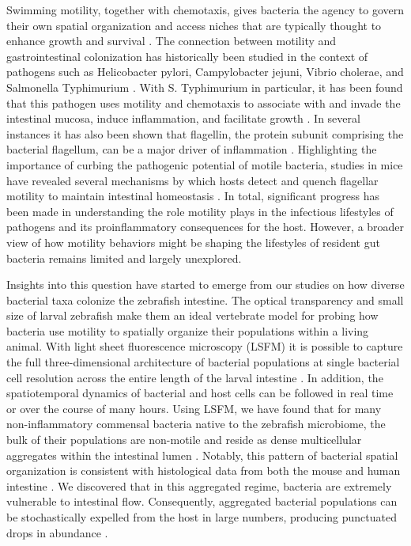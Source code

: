Swimming motility, together with chemotaxis, gives bacteria the agency to govern their own spatial organization and access niches that are typically thought to enhance growth and survival \cite{wei_population_2011,yawata_competition-dispersal_2014,raina_role_2019,stecher_motility_2008}. The connection between motility and gastrointestinal colonization has historically been studied in the context of pathogens such as Helicobacter pylori, Campylobacter jejuni, Vibrio cholerae, and Salmonella Typhimurium \cite{ottemann_roles_1997}. With S. Typhimurium in particular, it has been found that this pathogen uses motility and chemotaxis to associate with and invade the intestinal mucosa, induce inflammation, and facilitate growth \cite{stecher_motility_2008,rivera-chavez_energy_2016,stecher_flagella_2004}. In several instances it has also been shown that flagellin, the protein subunit comprising the bacterial flagellum, can be a major driver of inflammation \cite{ayres_lethal_2012,rui_reactogenicity_2010,zeng_flagellin_2003}. Highlighting the importance of curbing the pathogenic potential of motile bacteria, studies in mice have revealed several mechanisms by which hosts detect and quench flagellar motility to maintain intestinal homeostasis \cite{cullender_innate_2013,ayres_lethal_2012,fulde_neonatal_2018,okumura_lypd8_2016}. In total, significant progress has been made in understanding the role motility plays in the infectious lifestyles of pathogens and its proinflammatory consequences for the host. However, a broader view of how motility behaviors might be shaping the lifestyles of resident gut bacteria remains limited and largely unexplored.

Insights into this question have started to emerge from our studies on how diverse bacterial taxa colonize the zebrafish intestine. The optical transparency and small size of larval zebrafish make them an ideal vertebrate model for probing how bacteria use motility to spatially organize their populations within a living animal. With light sheet fluorescence microscopy (LSFM) it is possible to capture the full three-dimensional architecture of bacterial populations at single bacterial cell resolution across the entire length of the larval intestine \cite{parthasarathy_monitoring_2018}. In addition, the spatiotemporal dynamics of bacterial and host cells can be followed in real time or over the course of many hours. Using LSFM, we have found that for many non-inflammatory commensal bacteria native to the zebrafish microbiome, the bulk of their populations are non-motile and reside as dense multicellular aggregates within the intestinal lumen \cite{wiles_modernized_2018,schlomann_bacterial_2018}. Notably, this pattern of bacterial spatial organization is consistent with histological data from both the mouse and human intestine \cite{welch_spatial_2017,swidsinski_viscosity_2007,swidsinski_spatial_2005,van_der_waaij_vivo_1996}. We discovered that in this aggregated regime, bacteria are extremely vulnerable to intestinal flow. Consequently, aggregated bacterial populations can be stochastically expelled from the host in large numbers, producing punctuated drops in abundance \cite{wiles_host_2016,schlomann_sublethal_2019}. 

